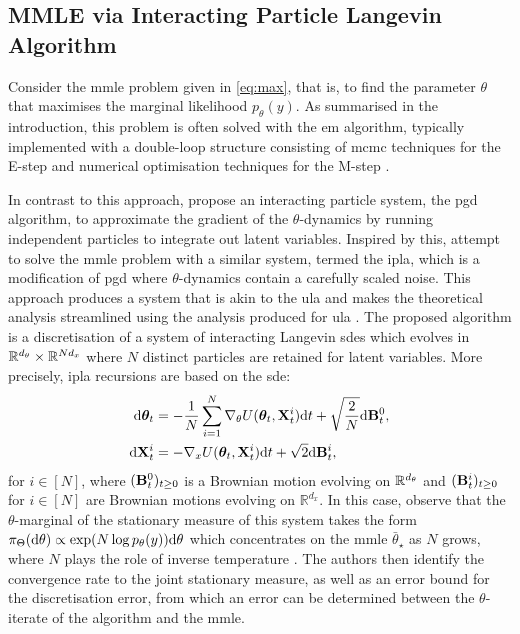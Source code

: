 \subsection{MMLE via Interacting Particle Langevin Algorithm}
Consider the \gls*{mmle} problem given in \eqref{eq:max}, that is, to find the parameter $\theta$ that maximises the marginal likelihood $p_\theta(y)$. As summarised in the introduction, this problem is often solved with the \gls*{em} algorithm, typically implemented with a double-loop structure consisting of \gls*{mcmc} techniques for the E-step and numerical optimisation techniques for the M-step \citep{atchade2017,de2021efficient}.

In contrast to this approach, \citep{kuntz2023particle} propose an interacting particle system, the \gls*{pgd} algorithm, to approximate the gradient of the $\theta$-dynamics by running independent particles to integrate out latent variables. Inspired by this, \citep{akyildiz2025interacting} attempt to solve the \gls*{mmle} problem with a similar system, termed the \gls*{ipla}, which is a modification of \gls*{pgd} where $\theta$-dynamics contain a carefully scaled noise. This approach produces a system that is akin to the \gls*{ula} and makes the theoretical analysis streamlined using the analysis produced for \gls*{ula} \citep{dalalyan2017theoretical, durmus2019high}. The proposed algorithm is a discretisation of a system of interacting Langevin \glspl*{sde} which evolves in ${\mathbb R}^{d_\theta} \times {\mathbb R}^{N d_x}$ where $N$ distinct particles are retained for latent variables. More precisely, \gls*{ipla} recursions are based on the \gls*{sde}:
\begin{align}
    \mathrm{d}\bm{\theta}_t &= -\frac{1}{N} \sum_{i=1}^N \nabla_\theta U(\bm{\theta}_t, {\mathbf X}_t^{i}) \mathrm{d}t + \sqrt{\frac{2}{N}}\mathrm{d}{\mathbf B}_t^0, \label{eq:ipla1}\\
    \mathrm{d}{\mathbf X}_t^{i} &= -\nabla_x U(\bm{\theta}_t, {\mathbf X}^i_t)\mathrm{d}t + \sqrt{2}\mathrm{d}{\mathbf B}_t^i, \label{eq:ipla2}
\end{align}
for $i \in [N]$, where $({\mathbf B}_t^0)_{t\geq 0}$ is a Brownian motion evolving on ${\mathbb R}^{d_\theta}$ and $({\mathbf B}_t^i)_{t\geq 0}$ for $i \in [N]$ are Brownian motions evolving on $\mathbb{R}^{d_x}$. In this case, \citep{akyildiz2025interacting} observe that the $\theta$-marginal of the stationary measure of this system takes the form $\pi_\Theta({\mathrm d} \theta) \propto \exp(N \log p_\theta(y)) {\mathrm d} \theta$ which concentrates on the \gls*{mmle} $\bar{\theta}_\star$ as $N$ grows, where $N$ plays the role of inverse temperature \citep{hwang1980laplace}. The authors then identify the convergence rate to the joint stationary measure, as well as an error bound for the discretisation error, from which an error can be determined between the $\theta$-iterate of the algorithm and the \gls*{mmle}.